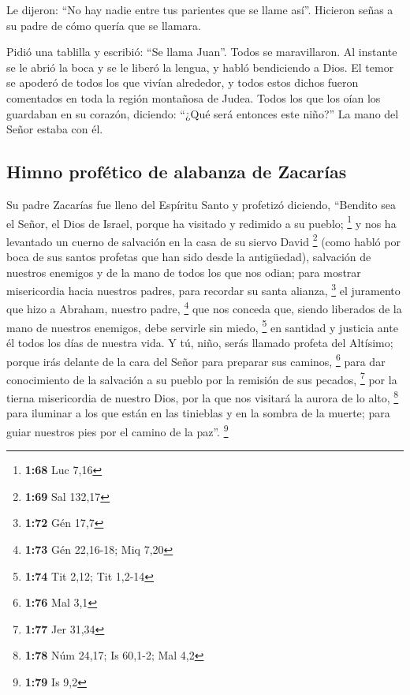  Le dijeron: ``No hay nadie entre tus parientes que se
llame así''.  Hicieron señas a su padre de cómo quería
que se llamara.

 Pidió una tablilla y escribió: ``Se llama Juan''. Todos
se maravillaron.  Al instante se le abrió la boca y se le
liberó la lengua, y habló bendiciendo a Dios.  El temor
se apoderó de todos los que vivían alrededor, y todos estos dichos
fueron comentados en toda la región montañosa de Judea. 
Todos los que los oían los guardaban en su corazón, diciendo: ``¿Qué
será entonces este niño?'' La mano del Señor estaba con él.

\hypertarget{himno-profuxe9tico-de-alabanza-de-zacaruxedas}{%
\subsection{Himno profético de alabanza de
Zacarías}\label{himno-profuxe9tico-de-alabanza-de-zacaruxedas}}

 Su padre Zacarías fue lleno del Espíritu Santo y
profetizó diciendo,  ``Bendito sea el Señor, el Dios de
Israel, porque ha visitado y redimido a su pueblo; \footnote{\textbf{1:68}
  Luc 7,16}  y nos ha levantado un cuerno de salvación en
la casa de su siervo David \footnote{\textbf{1:69} Sal 132,17}
 (como habló por boca de sus santos profetas que han sido
desde la antigüedad),  salvación de nuestros enemigos y
de la mano de todos los que nos odian;  para mostrar
misericordia hacia nuestros padres, para recordar su santa alianza,
\footnote{\textbf{1:72} Gén 17,7}  el juramento que hizo
a Abraham, nuestro padre, \footnote{\textbf{1:73} Gén 22,16-18; Miq 7,20}
 que nos conceda que, siendo liberados de la mano de
nuestros enemigos, debe servirle sin miedo, \footnote{\textbf{1:74} Tit
  2,12; Tit 1,2-14}  en santidad y justicia ante él todos
los días de nuestra vida.  Y tú, niño, serás llamado
profeta del Altísimo; porque irás delante de la cara del Señor para
preparar sus caminos, \footnote{\textbf{1:76} Mal 3,1} 
para dar conocimiento de la salvación a su pueblo por la remisión de sus
pecados, \footnote{\textbf{1:77} Jer 31,34}  por la
tierna misericordia de nuestro Dios, por la que nos visitará la aurora
de lo alto, \footnote{\textbf{1:78} Núm 24,17; Is 60,1-2; Mal 4,2}
 para iluminar a los que están en las tinieblas y en la
sombra de la muerte; para guiar nuestros pies por el camino de la paz''.
\footnote{\textbf{1:79} Is 9,2}

